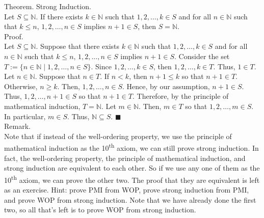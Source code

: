 \documentclass[twocolumn]{article}
\newcommand{\qed}{$\blacksquare$}
\newcommand{\naturals}{\mathbb{N}}
\begin{document}
Theorem. Strong Induction. \\
Let $S \subseteq \naturals$. If there exists $k \in \naturals$ such that $1, 2, \ldots, k \in S$ and for all $n \in \naturals$ such that $k \leq n$, $1, 2, \ldots, n \in S$ implies $n + 1 \in S$, then $S = \naturals$. \\
Proof. \\
Let $S \subseteq \naturals$. Suppose that there exists $k \in \naturals$ such that $1, 2, \ldots, k \in S$ and for all $n \in \naturals$ such that $k \leq n$, $1, 2, \ldots, n \in S$ implies $n + 1 \in S$. Consider the set $T := \{ n \in \naturals \mid 1, 2, \ldots, n \in S \}$. Since $1, 2, \ldots, k \in S$, then $1, 2, \ldots, k \in T$. Thus, $1 \in T$. Let $n \in \naturals$. Suppose that $n \in T$. If $n < k$, then $n + 1 \leq k$ so that $n + 1 \in T$. Otherwise, $n \geq k$. Then, $1, 2, \ldots, n \in S$. Hence, by our assumption, $n + 1 \in S$. Thus, $1, 2, \ldots, n + 1 \in S$ so that $n + 1 \in T$. Therefore, by the principle of mathematical induction, $T = \naturals$.  Let $m \in \naturals$. Then, $m \in T$ so that $1, 2, \ldots, m \in S$. In particular, $m \in S$. Thus, $\naturals \subseteq S$. \qed \\

Remark. \\
Note that if instead of the well-ordering property, we use the principle of mathematical induction as the 10\textsuperscript{th} axiom, we can still prove strong induction. In fact, the well-ordering property, the principle of mathematical induction, and strong induction are equivalent to each other. So if we use any one of them as the 10\textsuperscript{th} axiom, we can prove the other two. The proof that they are equivalent is left as an exercise. Hint: prove PMI from WOP, prove strong induction from PMI, and prove WOP from strong induction. Note that we have already done the first two, so all that's left is to prove WOP from strong induction. \\
\end{document}
